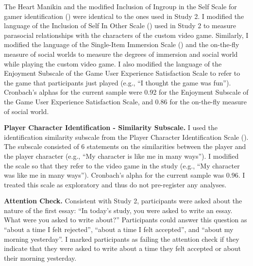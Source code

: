 \documentclass[
]{udthesis}
\begin{document}
The Heart Manikin and the modified Inclusion of Ingroup in the Self
Scale for gamer identification
() were identical to the ones
used in Study 2. I modified the language of the Inclusion of Self In
Other Scale () used in Study 2 to measure
parasocial relationships with the characters of the custom video game.
Similarly, I modified the language of the Single-Item Immersion Scale
() and the on-the-fly measure of
social worlds to measure the degrees of immersion and social world while
playing the custom video game. I also modified the language of the
Enjoyment Subscale of the Game User Experience Satisfaction Scale to
refer to the game that participants just played (e.g., ``I thought the
game was fun''). Cronbach's alphas for the current sample were
0.92 for the Enjoyment Subscale of the Game User
Experience Satisfaction Scale, and 0.86 for
the on-the-fly measure of social world.

\textbf{Player Character Identification - Similarity Subscale.} I used the
identification similarity subscale from the Player Character
Identification Scale (). The subscale consisted of 6
statements on the similarities between the player and the player
character (e.g., ``My character is like me in many ways''). I modified
the scale so that they refer to the video game in the study (e.g., ``My
character was like me in many ways''). Cronbach's alpha for the current
sample was 0.96. I treated this scale as
exploratory and thus do not pre-register any analyses.

\textbf{Attention Check.} Consistent with Study 2, participants were asked
about the nature of the first essay: ``In today's study, you were asked
to write an essay. What were you asked to write about?'' Participants
could answer this question as ``about a time I felt rejected'', ``about a
time I felt accepted'', and ``about my morning yesterday''. I marked
participants as failing the attention check if they indicate that they
were asked to write about a time they felt accepted or about their
morning yesterday.
\end{document}
